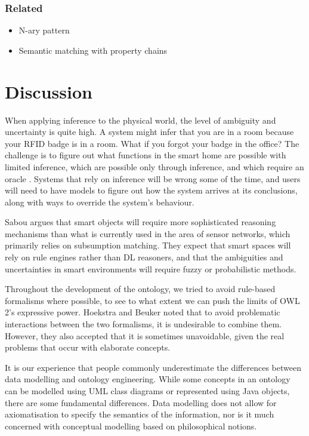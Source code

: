 \subsubsection{Related} 

\begin{itemize}
	\item N-ary pattern 
	\item Semantic matching with property chains
\end{itemize}


\section{Discussion}

When applying inference to the physical world, the level of ambiguity and uncertainty is quite high. A system might infer that you are in a room because your RFID badge is in a room. What if you forgot your badge in the office? The challenge is to figure out what functions in the smart home are possible with limited inference, which are possible only through inference, and which require an oracle \cite{Edwards2001}. Systems that rely on inference will be wrong some of the time, and users will need to have models to figure out how the system arrives at its conclusions, along with ways to override the system's behaviour.

Sabou \cite{Sabou2010} argues that smart objects will require more sophisticated reasoning mechanisms than what is currently used in the area of sensor networks, which primarily relies on subsumption matching. They expect that smart spaces will rely on rule engines rather than DL reasoners, and that the ambiguities and uncertainties in smart environments will require fuzzy or probabilistic methods.

Throughout the development of the ontology, we tried to avoid rule-based formalisms where possible, to see to what extent we can push the limits of OWL 2's expressive power. Hoekstra and Beuker \cite{Hoekstra2008} noted that to avoid problematic interactions between the two formalisms, it is undesirable to combine them. However, they also accepted that it is sometimes unavoidable, given the real problems that occur with elaborate concepts. 

It is our experience that people commonly underestimate the differences between data modelling and ontology engineering. While some concepts in an ontology can be modelled using UML class diagrams or represented using Java objects, there are some fundamental differences. Data modelling does not allow for axiomatisation to specify the semantics of the information, nor is it much concerned with conceptual modelling based on philosophical notions. 

